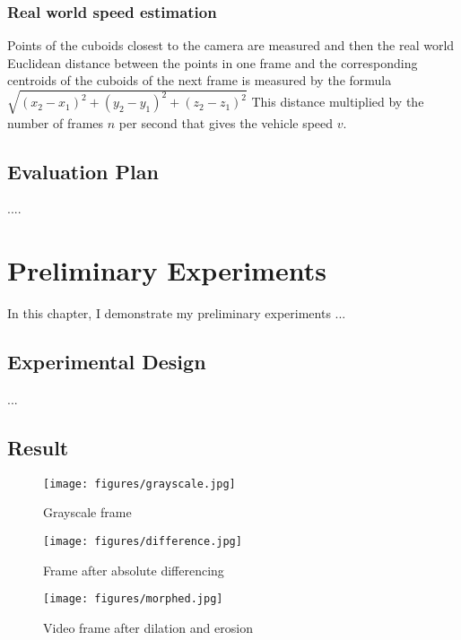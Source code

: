 \documentclass[a4paper]{aitthesis}
\begin{document}
\subsection{Real world speed estimation}
Points of the cuboids closest to the camera are measured and then the real world Euclidean distance between the points in one frame and the corresponding centroids of the cuboids of the next frame is measured by the formula $ \sqrt{(x_2 - x_1)^{2} + (y_2 - y_1)^{2} + (z_2 - z_1)^{2}} $ This distance multiplied by the number of frames $n$ per second that gives the vehicle speed $v$.

\section{Evaluation Plan}
....
  
\FloatBarrier

%
\chapter{Preliminary Experiments} \label{preliminary}

In this chapter, I demonstrate my preliminary experiments ...

\section{Experimental Design}
...

\section{Result}
\begin{figure}[H]
\begin{center}
\texttt{[image: figures/grayscale.jpg]}
\caption{Grayscale frame}
\end{center}
\end{figure}




\begin{figure}[H]
\begin{center}
\texttt{[image: figures/difference.jpg]}
\caption{Frame after absolute differencing}
\end{center}
\end{figure}


\begin{figure}[H]
\begin{center}
\texttt{[image: figures/morphed.jpg]}
\caption{Video frame after dilation and erosion}
\end{center}
\end{figure}
\end{document}
